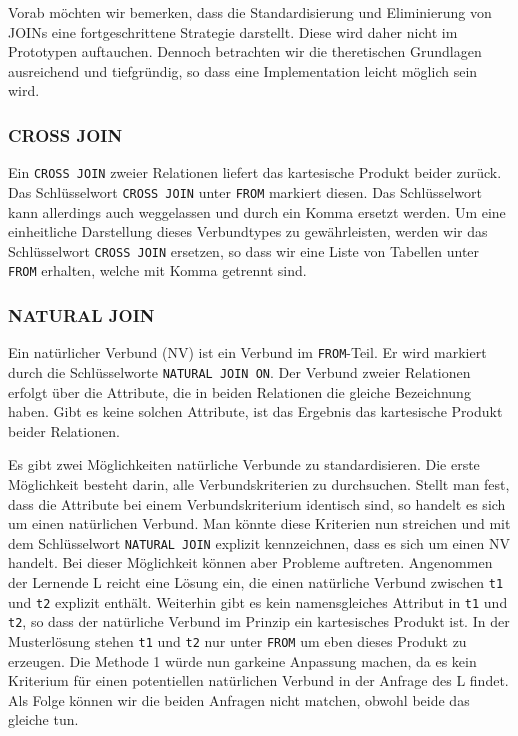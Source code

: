 Vorab möchten wir bemerken, dass die Standardisierung und Eliminierung von JOINs eine fortgeschrittene Strategie darstellt. Diese wird daher nicht im Prototypen auftauchen. Dennoch betrachten wir die theretischen Grundlagen ausreichend und tiefgründig, so dass eine Implementation leicht möglich sein wird.

\subsubsection*{CROSS JOIN}

Ein \verb|CROSS JOIN| zweier Relationen liefert das kartesische Produkt beider zurück. Das Schlüsselwort \verb|CROSS JOIN| unter \verb|FROM| markiert diesen. Das Schlüsselwort kann allerdings auch weggelassen und durch ein Komma ersetzt werden. Um eine einheitliche Darstellung dieses Verbundtypes zu gewährleisten, werden wir das Schlüsselwort \verb|CROSS JOIN| ersetzen, so dass wir eine Liste von Tabellen unter \verb|FROM| erhalten, welche mit Komma getrennt sind.

\subsubsection*{NATURAL JOIN}

Ein natürlicher Verbund (NV) ist ein Verbund im \verb|FROM|-Teil. Er wird markiert durch die Schlüsselworte \verb|NATURAL JOIN ON|. Der Verbund zweier Relationen erfolgt über die Attribute, die in beiden Relationen die gleiche Bezeichnung haben. Gibt es keine solchen Attribute, ist das Ergebnis das kartesische Produkt beider Relationen.

Es gibt zwei Möglichkeiten natürliche Verbunde zu standardisieren. Die erste Möglichkeit besteht darin,   alle Verbundskriterien zu durchsuchen. Stellt man fest, dass die Attribute bei einem Verbundskriterium identisch sind, so handelt es sich um einen natürlichen Verbund. Man könnte diese Kriterien nun streichen und mit dem Schlüsselwort \verb|NATURAL JOIN| explizit kennzeichnen, dass es sich um einen NV handelt. Bei dieser Möglichkeit können aber Probleme auftreten. Angenommen der Lernende L reicht eine Lösung ein, die einen natürliche Verbund zwischen \verb|t1| und \verb|t2| explizit enthält. Weiterhin gibt es kein namensgleiches Attribut in \verb|t1| und \verb|t2|, so dass der natürliche Verbund im Prinzip ein kartesisches Produkt ist. In der Musterlösung stehen \verb|t1| und \verb|t2| nur unter \verb|FROM| um eben dieses Produkt zu erzeugen. Die Methode 1 würde nun garkeine Anpassung machen, da es kein Kriterium für einen potentiellen natürlichen Verbund in der Anfrage des L findet. Als Folge können wir die beiden Anfragen nicht matchen, obwohl beide das gleiche tun.

